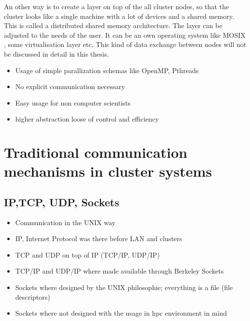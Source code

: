  An
other way is to create a layer on top of the all cluster nodes, so
that the cluster looks like a single machine with a lot of devices and
a shared memory. This is called a distributed shared memory
architecture. The layer can be adjusted to the needs of the user.  It
can be an own operating system like MOSIX \cite{ref:mosix}, some
virtualisation layer \cite{ref:cluster_virt} etc.  This kind of data
exchange between nodes will not be discussed in detail in this thesis.
\begin{itemize}
\item Usage of simple parallization schemas like OpenMP, Pthreads
\item No explicit communication necessary
\item Easy usage for non computer scientists
\item higher abstraction \rightarrow loose of control and efficiency
\end{itemize}


\section{Traditional communication mechanisms in cluster systems}
\label{sec:communication}


\subsection{IP,TCP, UDP, Sockets}
\label{sec:tcp_udp_ip}
\begin{itemize}
  \item Communication in the UNIX way
  \item IP, Internet Protocol was there before LAN and clusters \cite{ref:ip}
  \item TCP and UDP on top of IP (TCP/IP, UDP/IP) \cite{ref:tcp, ref:udp}
  \item TCP/IP and UDP/IP where made available through Berkeley Sockets \cite{ref:sockets}
  \item Sockets where designed by the UNIX philosophie; everything is a file (file descriptors)
  \item Sockets where not designed with the usage in hpc environment in mind
\end{itemize}

